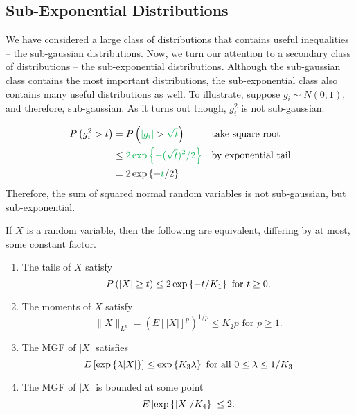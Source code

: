 

\subsection{Sub-Exponential Distributions}
We have considered a large class of distributions that contains useful inequalities -- the sub-gaussian distributions. Now, we turn our attention to a secondary class of distributions -- the sub-exponential distributions. Although the sub-gaussian class contains the most important distributions, the sub-exponential class also contains many useful distributions as well. To illustrate, suppose $g_i \sim N(0, 1),$ and therefore, sub-gaussian. As it turns out though, $g_i^2$ is not sub-gaussian. 

\begin{align*}
    \Prob{g_i^2 > t} &= \Prob{\textcolor{\dgreen}{|g_i|} > \textcolor{\dgreen}{\sqrt{t}}} && \text{take square root} \\
    &\leq \textcolor{\dgreen}{2\exponential{-(\sqrt{t})^2/2}} && 
        \text{by exponential tail} \\ 
    &= 2\exponential{-\textcolor{\dgreen}{t}/2}
\end{align*}
Therefore, the sum of squared normal random variables is not sub-gaussian, but sub-exponential.  \\

\begin{tcolorbox}
\begin{proposition}
If $X$ is a random variable, then the following are equivalent, differing by at most, some constant factor. 
\begin{enumerate}
    \item The tails of $X$ satisfy
        $$ P\left(|X| \geq t \right) \leq 2 \exp\left\{-t/K_1 \right\} \text{ for $t \geq 0$.} $$
    \item The moments of $X$ satisfy
        $$ \|X\|_{L^p} = \left(E[|X|]^p \right)^{1/p} \leq K_2 p \text{ for $p \geq 1$.} $$
    \item The MGF of $|X|$ satisfies
        $$E\left[\exp\left\{\lambda |X| \right\} \right] \leq \exp\left\{K_3 \lambda \right\} \text{ for all $0 \leq \lambda \leq 1/K_3$}$$
    \item The MGF of $|X|$ is bounded at some point
        $$ E\left[\exp\left\{|X|/K_4 \right\} \right] \leq 2.$$
\end{enumerate}
\label{prop:subexp}
\end{proposition}
\end{tcolorbox}


